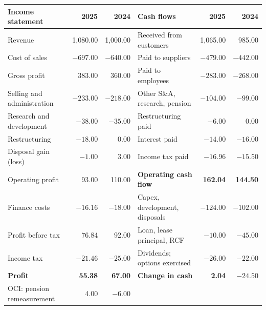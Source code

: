 \begin{qfexample}
\begin{center}\small
\begin{tabular}{@{}lrr@{\qquad}lrr@{}}
\toprule
Income statement & 2025 & 2024 & Cash flows & 2025 & 2024\\
\midrule
Revenue & 1{,}080.00 & 1{,}000.00 & Received from customers & 1{,}065.00 & 985.00\\
Cost of sales & $-697.00$ & $-640.00$ & Paid to suppliers & $-479.00$ & $-442.00$\\
Gross profit & 383.00 & 360.00 & Paid to employees & $-283.00$ & $-268.00$\\
Selling and administration & $-233.00$ & $-218.00$ & Other S\&A, research, pension & $-104.00$ & $-99.00$\\
Research and development & $-38.00$ & $-35.00$ & Restructuring paid & $-6.00$ & 0.00\\
Restructuring & $-18.00$ & 0.00 & Interest paid & $-14.00$ & $-16.00$\\
Disposal gain (loss) & $-1.00$ & 3.00 & Income tax paid & $-16.96$ & $-15.50$\\
Operating profit & 93.00 & 110.00 & \textbf{Operating cash flow} & \textbf{162.04} & \textbf{144.50}\\
Finance costs & $-16.16$ & $-18.00$ & Capex, development, disposals & $-124.00$ & $-102.00$\\
Profit before tax & 76.84 & 92.00 & Loan, lease principal, RCF & $-10.00$ & $-45.00$\\
Income tax & $-21.46$ & $-25.00$ & Dividends; options exercised & $-26.00$ & $-22.00$\\
\textbf{Profit} & \textbf{55.38} & \textbf{67.00} & \textbf{Change in cash} & \textbf{2.04} & $\mathbf{-24.50}$\\
OCI: pension remeasurement & 4.00 & $-6.00$ & & &\\
\bottomrule
\end{tabular}
\end{center}


\end{qfexample}
